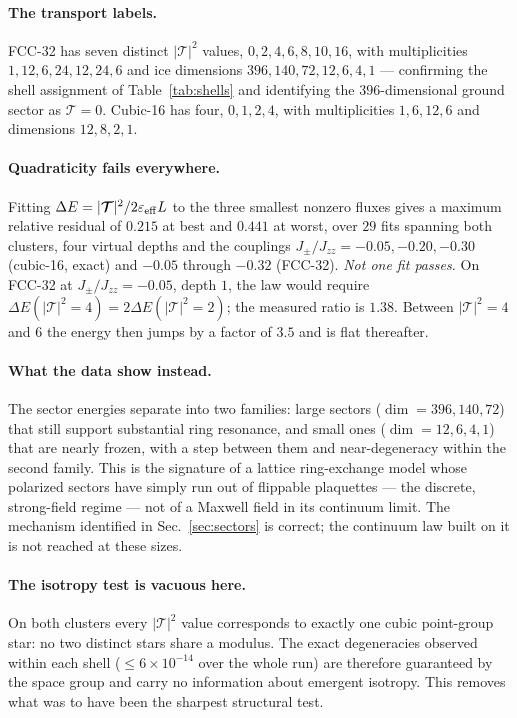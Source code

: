 \documentclass[aps,prb,preprint,amsmath,amssymb,superscriptaddress,
longbibliography,floatfix]{revtex4-2}
\newcommand{\Jzz}{J_{zz}}
\newcommand{\Jpm}{J_{\pm}}
\DeclareRobustCommand{\bT}{\bm{\mathcal T}}
\begin{document}
\paragraph{The transport labels.}  FCC-32 has seven distinct $|\bT|^2$ values,
$0,2,4,6,8,10,16$, with multiplicities $1,12,6,24,12,24,6$ and ice dimensions
$396,140,72,12,6,4,1$ --- confirming the shell assignment of
Table~\ref{tab:shells} and identifying the $396$-dimensional ground sector as
$\bT=0$.  Cubic-16 has four, $0,1,2,4$, with multiplicities $1,6,12,6$ and
dimensions $12,8,2,1$.

\paragraph{Quadraticity fails everywhere.}  Fitting
$\Delta E=|\bT|^2/2\varepsilon_{\rm eff}L$ to the three smallest nonzero fluxes
gives a maximum relative residual of $0.215$ at best and $0.441$ at worst, over
$29$ fits spanning both clusters, four virtual depths and the couplings
$\Jpm/\Jzz=-0.05,-0.20,-0.30$ (cubic-16, exact) and $-0.05$ through $-0.32$
(FCC-32).  \emph{Not one fit passes.}  On FCC-32 at $\Jpm/\Jzz=-0.05$, depth
$1$, the law would require $\Delta E(|\bT|^2\!=\!4)=2\Delta E(|\bT|^2\!=\!2)$;
the measured ratio is $1.38$.  Between $|\bT|^2=4$ and $6$ the energy then
jumps by a factor of $3.5$ and is flat thereafter.

\paragraph{What the data show instead.}  The sector energies separate into two
families: large sectors ($\dim=396,140,72$) that still support substantial ring
resonance, and small ones ($\dim=12,6,4,1$) that are nearly frozen, with a step
between them and near-degeneracy within the second family.  This is the
signature of a lattice ring-exchange model whose polarized sectors have simply
run out of flippable plaquettes --- the discrete, strong-field regime --- not of
a Maxwell field in its continuum limit.  The mechanism identified in
Sec.~\ref{sec:sectors} is correct; the continuum law built on it is not
reached at these sizes.

\paragraph{The isotropy test is vacuous here.}  On both clusters every
$|\bT|^2$ value corresponds to exactly one cubic point-group star: no two
distinct stars share a modulus.  The exact degeneracies observed within each
shell ($\le6\times10^{-14}$ over the whole run) are therefore guaranteed by the
space group and carry no information about emergent isotropy.  This removes
what was to have been the sharpest structural test.
\end{document}
